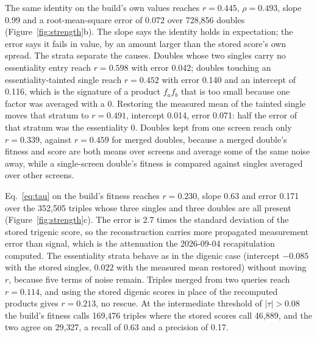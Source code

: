 The same identity on the build's own values reaches $r = 0.445$, $\rho = 0.493$,
slope 0.99 and a root-mean-square error of 0.072 over 728{,}856 doubles
(Figure~\ref{fig:strength}b). The slope says the identity holds in expectation; the
error says it fails in value, by an amount larger than the stored score's own spread.
The strata separate the causes. Doubles whose two singles carry no essentiality entry
reach $r = 0.598$ with error 0.042; doubles touching an essentiality-tainted single
reach $r = 0.452$ with error 0.140 and an intercept of 0.116, which is the signature
of a product $f_a f_b$ that is too small because one factor was averaged with a 0.
Restoring the measured mean of the tainted single moves that stratum to $r = 0.491$,
intercept 0.014, error 0.071: half the error of that stratum was the essentiality 0.
Doubles kept from one screen reach only $r = 0.339$, against $r = 0.459$ for merged
doubles, because a merged double's fitness and score are both means over screens and
average some of the same noise away, while a single-screen double's fitness is
compared against singles averaged over other screens.

Eq.~\ref{eq:tau} on the build's fitness reaches $r = 0.230$, slope 0.63 and error
0.171 over the 352{,}505 triples whose three singles and three doubles are all present
(Figure~\ref{fig:strength}c). The error is 2.7 times the standard deviation of the
stored trigenic score, so the reconstruction carries more propagated measurement
error than signal, which is the attenuation the 2026-09-04 recapitulation computed.
The essentiality strata behave as in the digenic case (intercept $-0.085$ with the
stored singles, $0.022$ with the measured mean restored) without moving $r$, because
five terms of noise remain. Triples merged from two queries reach $r = 0.114$, and
using the stored digenic scores in place of the recomputed products gives
$r = 0.213$, no rescue. At the intermediate threshold of $|\tau| > 0.08$ the build's
fitness calls 169{,}476 triples where the stored scores call 46{,}889, and the two
agree on 29{,}327, a recall of 0.63 and a precision of 0.17.

